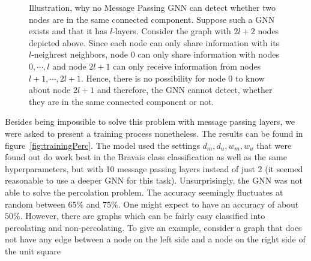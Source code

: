 \begin{figure}
    \centering
    \caption{Illustration, why no Message Passing GNN can detect whether two nodes are in the same connected component. 
    Suppose such a GNN exists and that it has $l$-layers. Consider the graph with $2l+2$ nodes depicted above. 
    Since each node can only share information with its $l$-neighrest neighbors, 
    node 0 can only share information with nodes $0,\cdots,l$
    and node $2l+1$ can only receive information from nodes $l+1,\cdots,2l+1$. 
    Hence, there is no possibility for node $0$ to know about node $2l+1$ and 
    therefore, the GNN cannot detect, whether they are in the same connected component or not.}
    \label{fig:gnn_connectedComponent}
\end{figure}
Besides being impossible to solve this problem with message passing layers, we were asked to present a training process nonetheless. 
The results can be found in figure~\ref{fig:trainingPerc}. 
The model used the settings $d_m, d_u, w_m, w_u$ that were found out do work best in the Bravais class classification as well as the same hyperparameters, 
but with 10 message passing layers instead of just 2 (it seemed reasonable to use a deeper GNN for this task). 
Unsurprisingly, the GNN was not able to solve the percolation problem. 
The accuracy seemingly fluctuates at random between $65\%$ and $75\%$. One might expect to have an accuracy of about $50\%$. 
However, there are graphs which can be fairly easy classified into percolating and non-percolating. 
To give an example, consider a graph that does not have any edge between a node on the left side and a node on the right side of the unit square

